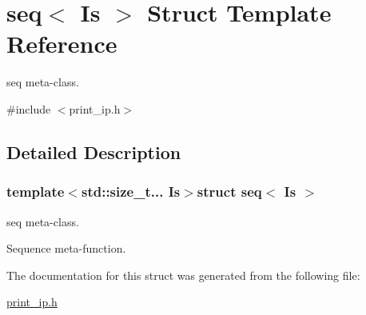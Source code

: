 \hypertarget{structseq}{\section{seq$<$ Is $>$ Struct Template Reference}
\label{structseq}
}


seq meta-\/class.  




{\ttfamily \#include $<$print\-\_\-ip.\-h$>$}



\subsection{Detailed Description}
\subsubsection*{template$<$std\-::size\-\_\-t... Is$>$struct seq$<$ Is $>$}

seq meta-\/class. 

Sequence meta-\/function. 

The documentation for this struct was generated from the following file\-:\begin{DoxyCompactItemize}
\item 
\hyperlink{print__ip_8h}{print\-\_\-ip.\-h}\end{DoxyCompactItemize}
